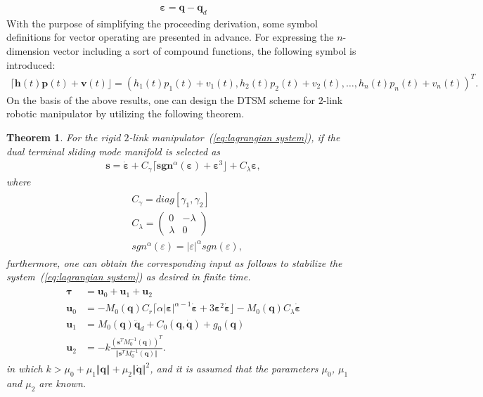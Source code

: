 \documentclass[3p]{elsarticle}
\theoremstyle{plain}
\newtheorem{mythm}{Theorem}
\theoremstyle{remark}
\begin{document}
\begin{align}
\bm \varepsilon = \bm q -\bm q_d
\end{align}
With the purpose of simplifying the proceeding derivation, some symbol definitions for vector operating are presented in advance. For expressing the $n$-dimension vector including a sort of compound functions, the following symbol is introduced:
\begin{align*}
\lceil\bm h(t)\bm p(t)+\bm v(t)\rfloor = (h_1(t)p_1(t)+v_1(t),h_2(t)p_2(t)+v_2(t),\ldots,h_n(t)p_n(t)+v_n(t))^T.
\end{align*}
On the basis of the above results, one can design the DTSM scheme for $2$-link robotic manipulator by utilizing the following theorem.
\begin{mythm}\label{theorem:4}
For the rigid $2$-link manipulator~(\ref{eq:lagrangian system}), if the dual terminal sliding mode manifold is selected as
\begin{align}
\bm s = \dot{\bm \varepsilon}+C_\gamma\lceil\bm{sgn}^\alpha(\bm \varepsilon)+\bm\varepsilon^3\rfloor+C_\lambda{\bm\varepsilon},\label{eq:lagrangian manifold}
\end{align}
where
\begin{align}
\begin{split}
&C_\gamma=diag[\gamma_1,\gamma_2]\\
&C_\lambda=
\begin{pmatrix}
0 &-\lambda\\ \lambda &0
\end{pmatrix}\\
&{sgn}^\alpha(\varepsilon)=\vert\varepsilon\vert^\alpha sgn(\varepsilon),
\end{split}
\end{align}
furthermore, one can obtain the corresponding input as follows to stabilize the system~(\ref{eq:lagrangian system}) as desired in finite time.
\begin{align}
\begin{split}
\bm\tau &= \bm u_0+\bm u_1 +\bm u_2\\
\bm u_0 &= -M_0(\bm q)C_r\lceil\alpha\vert\bm\varepsilon\vert^{\alpha-1}\dot{\bm \varepsilon}+3\bm \varepsilon^2\dot{\bm \varepsilon}\rfloor-M_0(\bm q)C_\lambda\dot{\bm \varepsilon}\\
\bm u_1 &= M_0(\bm q)\ddot {\bm q}_d+C_0(\bm q,\dot {\bm q})+g_0(\bm q)\\
\bm u_2 &= -k\frac{(\bm s^TM_0^{-1}(\bm q))^T}{\Vert\bm s^TM_0^{-1}(\bm q)\Vert}.
\end{split}
\end{align}
in which $k>\mu_0+\mu_1\Vert\bm q\Vert+\mu_2\Vert\dot{\bm q}\Vert^2$, and it is assumed that the parameters $\mu_0$, $\mu_1$ and $\mu_2$ are known.
\end{mythm}
\end{document}
